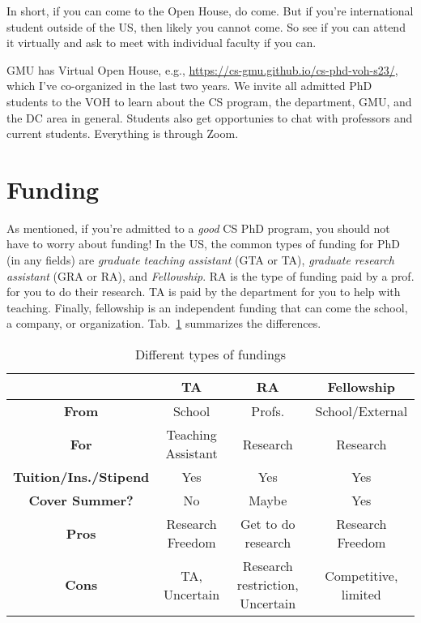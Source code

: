 \documentclass[10pt]{article}
\begin{document}
In short, if you can come to the Open House, do come.  But if you're international student outside of the US, then likely you cannot come.  So see if you can attend it virtually and ask to meet with individual faculty if you can.

\begin{tcolorbox}[left=1pt,right=1pt,top=1pt,bottom=1pt]
GMU has Virtual Open House, e.g., \url{https://cs-gmu.github.io/cs-phd-voh-s23/}, which I've co-organized in the last two years. We invite all admitted PhD students to the VOH to learn about the CS program, the department, GMU, and the DC area in general. Students also get opportunies to chat with professors and current students.  Everything is through Zoom.
\end{tcolorbox}



\section{Funding}\label{sec:funding}

As mentioned, if you're admitted to a \emph{good} CS PhD program, you should not have to worry about funding!  
In the US, the common types of funding for PhD (in any fields) are \emph{graduate teaching assistant} (GTA or TA), \emph{graduate research assistant} (GRA or RA), and \emph{Fellowship}.
RA is the type of funding paid by a prof. for you to do their research. TA is paid by the department for you to help with teaching. Finally, fellowship is an independent funding that can come the school, a company, or organization. Tab.~\ref{tab:funding} summarizes the differences. 

\begin{table}
  \centering
  \caption{Different types of fundings}\label{tab:funding}
  \begin{tabular}{c|c|c|c}
    \toprule
    &\textbf{TA}&\textbf{RA}&\textbf{Fellowship}\\
    \midrule
    \textbf{From} & School & Profs. & School/External\\
    \textbf{For}                  & Teaching Assistant       & Research                        & Research                              \\
    \textbf{Tuition/Ins./Stipend} & Yes                      & Yes                             & Yes                                   \\
    \textbf{Cover Summer?}              & No                       & Maybe                           & Yes                                   \\
    \midrule
    \textbf{Pros}                 & Research Freedom         & Get to do research              & Research Freedom                      \\
    \textbf{Cons}                 & TA, Uncertain            & Research restriction, Uncertain & Competitive, limited             \\
    \bottomrule
  \end{tabular}
\end{table}
\end{document}
